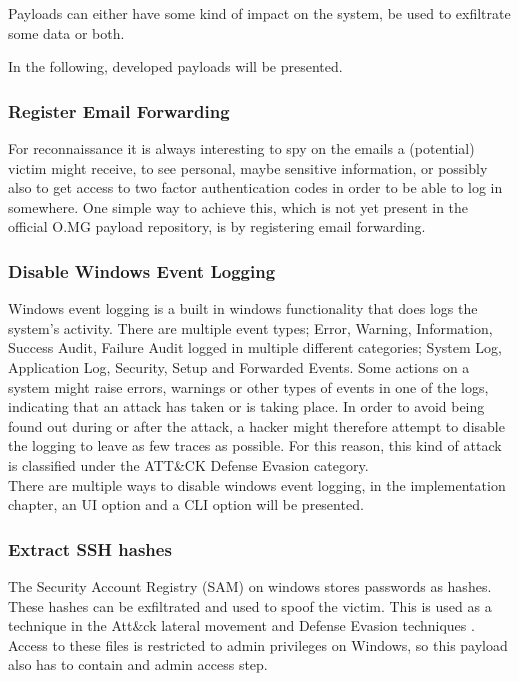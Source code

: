 Payloads can either have some kind of impact on the system, be used to exfiltrate some data or both.

In the following, developed payloads will be presented.

\subsubsection{Register Email Forwarding}

For reconnaissance it is always interesting to spy on the emails a (potential) victim might receive, to see personal, maybe sensitive information, or possibly also to get access to two factor authentication codes in order to be able to log in somewhere. One simple way to achieve this, which is not yet present in the official O.MG payload repository, is by registering email forwarding. 



\subsubsection{Disable Windows Event Logging}

Windows event logging is a built in windows functionality that does logs the system's activity. There are multiple event types; Error, Warning, Information, Success Audit, Failure Audit logged in multiple different categories; System Log, Application Log, Security, Setup and Forwarded Events. 
Some actions on a system might raise errors, warnings or other types of events in one of the logs, indicating that an attack has taken or is taking place. In order to avoid being found out during or after the attack, a hacker might therefore attempt to disable the logging to leave as few traces as possible. For this reason, this kind of attack is classified under the ATT\&CK Defense Evasion category. \\
There are multiple ways to disable windows event logging, in the implementation chapter, an UI option and a CLI option will be presented. 


\subsubsection{Extract SSH hashes}

The Security Account Registry (SAM) on windows stores passwords as hashes. These hashes can be exfiltrated and used to spoof the victim. This is used as a technique in the Att\&ck lateral movement and Defense Evasion techniques \cite{UseAlternateAuthentication}. \\
Access to these files is restricted to admin privileges on Windows, so this payload also has to contain and admin access step.

